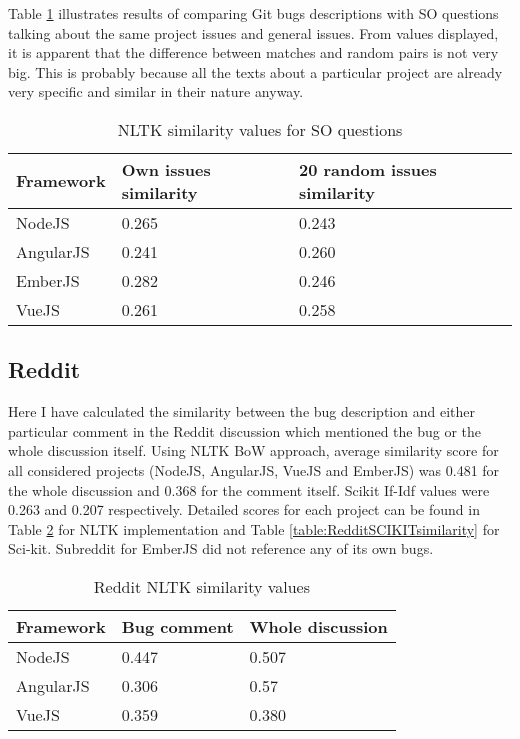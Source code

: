 Table \ref{table:StackOverflowNLTKsimilarity} illustrates results of comparing Git bugs descriptions with SO questions talking about the same project issues and general issues. From values displayed, it is apparent that the difference between matches and random pairs is not very big. This is probably because all the texts about a particular project are already very specific and similar in their nature anyway.

\begin{table}[H]
\centering
\begin{tabular}{ |p{3cm}||p{4.5cm}|p{5.5cm}|}
 \hline
\textbf{ Framework }& \textbf{Own issues similarity}& \textbf{20 random issues similarity}\\
 \hline
 NodeJS   & 0.265 & 0.243\\ \hline
 AngularJS & 0.241 & 0.260\\ \hline
 EmberJS & 0.282 & 0.246\\ \hline 
 VueJS &   0.261 & 0.258\\ \hline
\end{tabular}
\caption{NLTK similarity values for SO questions}
\label{table:StackOverflowNLTKsimilarity}
\end{table}

\subsection{Reddit}Here I have calculated the similarity between the bug description and either particular comment in the Reddit discussion which mentioned the bug or the whole discussion itself. Using NLTK BoW approach, average similarity score for all considered projects (NodeJS, AngularJS, VueJS and EmberJS) was 0.481 for the whole discussion and 0.368 for the comment itself. Scikit If-Idf values were 0.263 and 0.207 respectively. Detailed scores for each project can be found in Table \ref{table:RedditNLTKsimilarity} for NLTK implementation and Table \ref{table:RedditSCIKITsimilarity} for Sci-kit. Subreddit for EmberJS did not reference any of its own bugs.

\begin{table}[H]
\centering
\begin{tabular}{ |p{3cm}||p{3cm}|p{4cm}|}
 \hline
\textbf{ Framework }& \textbf{Bug comment}& \textbf{Whole discussion}\\
 \hline
 NodeJS   & 0.447 & 0.507\\ \hline 
 AngularJS & 0.306 & 0.57 \\ \hline 
 VueJS &   0.359 & 0.380\\ \hline
\end{tabular}
\caption{Reddit NLTK similarity values}
\label{table:RedditNLTKsimilarity}
\end{table}

